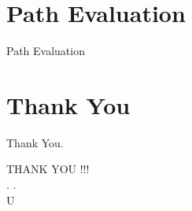 \documentclass[10pt, a4paper]{beamer}
\begin{document}
\section{Path Evaluation}
\begin{frame}{\begin{center}
			Path Evaluation
		\end{center}}\vspace{-2cm}
	\begin{figure}[ht]
	\end{figure}
\end{frame}

\section{Thank You}
\begin{frame}{\begin{center}
Thank You.
		\end{center}}\vspace{-2cm}
	\centering THANK YOU !!!\\
	. .\\
	 U 
\end{frame}
\end{document}
